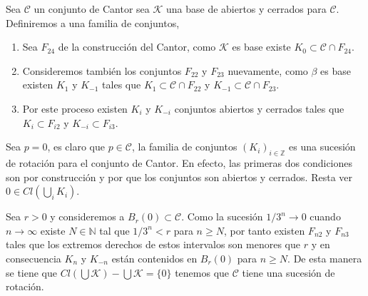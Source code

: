 \documentclass{subfiles}
\begin{document}
\begin{ej} 
Sea $\mathcal{C}$ un conjunto de Cantor sea $\mathcal{K}$ una base de abiertos y cerrados para $\mathcal{C}$. Definiremos a una familia de conjuntos, 
	
	\begin{enumerate}
		\item Sea $F_{24}$ de la construcción del Cantor, como $\mathcal{K}$ es base existe $K_0 \subset \mathcal{C} \cap F_{24}$.
		\item  Consideremos también los conjuntos $F_{22}$ y $F_{23}$ nuevamente, como $\beta$ es base existen $K_1$ y $K_{-1}$ tales que $K_1 \subset \mathcal{C} \cap F_{22}$ y $K_{-1} \subset \mathcal{C} \cap F_{23}$.
\item Por este proceso existen $K_{i}$ y $K_{-i} $ conjuntos abiertos y cerrados tales que $K_i \subset F_{i2}$ y $K_{-i} \subset F_{i3}$.
	\end{enumerate}
Sea $p=0$, es claro que $p \in \mathcal{C}$, la familia de conjuntos $(K_i)_{i \in \mathbb{Z}}$ es una sucesión de rotación para el conjunto de Cantor. En efecto, las primeras dos condiciones son por construcción y por que los conjuntos son abiertos y cerrados. Resta ver $0 \in Cl(\bigcup_i K_i)$. 

Sea $r >0 $ y consideremos a $B_r(0) \subset \mathcal{C}$. Como la sucesión $1/3^n \to 0$ cuando $n \to \infty$ existe $N \in \mathbb{N}$ tal que $1/3^n < r$ para $n \geq N$, por tanto existen $F_{n2}$ y $F_{n3}$ tales que los extremos derechos de estos intervalos son menores que $r$ y en consecuencia $K_{n}$ y $K_{-n}$ están contenidos en $B_r(0)$ para $n \geq N.$ De esta manera se tiene que $Cl(\bigcup \mathcal{K})- \bigcup \mathcal{K}=\{0\}$ tenemos que $\mathcal{C}$ tiene una sucesión de rotación. 
\end{ej}
\end{document}
